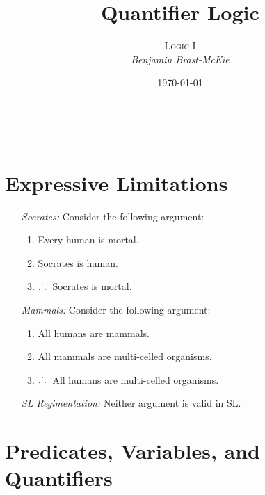 \documentclass[a4paper, 11pt]{article} %
\title{\textbf{Quantifier Logic}} %
\author{\textsc{Logic I}\\ \em Benjamin Brast-McKie} %
\date{\today} %
\makeatletter
\def\therefore{\ensuremath{\ldotp\dot{}\,\ldotp}}
\renewcommand{\maketitle}{ %
\begin{flushright} %
{\LARGE\@title} %

\vspace{10pt} %

{\@author} %
\\\@date %

\vspace{15pt} %
\end{flushright}
}
\makeatother
\begin{document}
\maketitle %

\thispagestyle{empty}


\section*{Expressive Limitations}

\begin{enumerate}
  \item[\it Socrates:] Consider the following argument:
  \begin{enumerate}
    \item Every human is mortal.
    \item Socrates is human.
    \item \therefore\ Socrates is mortal.
  \end{enumerate}
  \item[\it Mammals:] Consider the following argument:
  \begin{enumerate}
    \item All humans are mammals.
    \item All mammals are multi-celled organisms.
    \item \therefore\ All humans are multi-celled organisms.
  \end{enumerate}
  \item[\it SL Regimentation:] Neither argument is valid in SL.
\end{enumerate}




\section*{Predicates, Variables, and Quantifiers}
\end{document}
